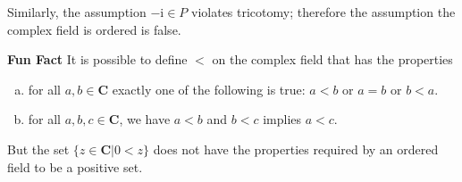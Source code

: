 \documentclass[12pt,fleqn,answers]{exam}
\newenvironment{alphalist}{
  \begin{enumerate}[(a)]
    \addtolength{\itemsep}{0.0\itemsep}}
  {\end{enumerate}}
\newcommand{\complex}{\mathbf{C}}
\begin{document}
\begin{questions}
\begin{solution}
\begin{solution}
    \quad Similarly, the assumption $-\mathrm{i} \in P$ violates
    tricotomy;  therefore the assumption the complex field is ordered is false.
  
  
    \textbf{Fun Fact} It is possible to define $<$ on the complex field that
    has the properties
    \begin{alphalist}
      \item for all $a,b \in \complex$ exactly one of the following
      is true:  $a<b$ or $a=b$ or $b < a$.
      \item for all $a,b,c \in \complex$, we have $a<b$ and $b < c$ implies
       $a < c$.
    \end{alphalist}
  But the set $\{z \in \complex | 0 < z\}$ does not have the properties 
  required by an ordered field to be a positive set.
  
  \end{solution}
\end{solution}

\end{questions}
\end{document}
